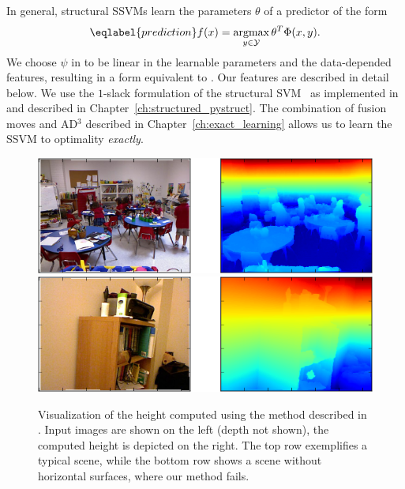 In general, structural SSVMs learn the parameters $\theta$ of a predictor of the form
\begin{equation}\eqlabel{prediction}
f(x) = \argmax_{y \in \mathcal{Y}} \theta^T \Phi(x, y).
\end{equation}
We choose $\psi$ in  to be linear in the learnable parameters and
the data-depended features, resulting in a form equivalent to
. Our features are described in detail below.  We use the
$1$-slack formulation of the structural SVM~\citep{joachims2009cutting} as
implemented in \pystruct and described in Chapter~\ref{ch:structured_pystruct}. The combination
of fusion moves and AD$^3$ described in Chapter~\ref{ch:exact_learning} allows us
to learn the SSVM to optimality \emph{exactly}.

\begin{figure}
    \begin{center}
        \includegraphics[width=\linewidth]{nyu/images/height_success}\\
        \vspace{3mm}
        \includegraphics[width=\linewidth]{nyu/images/height_failure}
    \end{center}
    \caption{%
        Visualization of the height computed using the method described in .
        Input images are shown on the left (depth not shown), the computed height is depicted on the right.
        The top row exemplifies a typical scene, while the bottom row shows a scene without horizontal
        surfaces, where our method fails.
    }
\end{figure}

